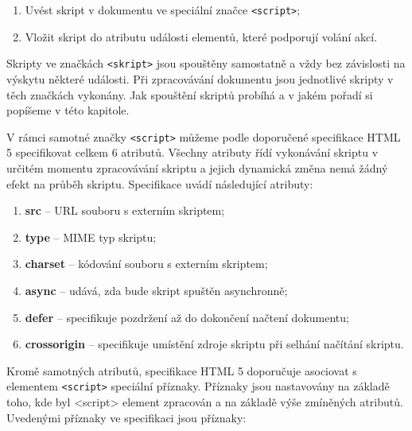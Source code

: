 \begin{enumerate}
  \item Uvést skript v dokumentu ve speciální značce \texttt{<script>};
  \item Vložit skript do atributu události elementů, které podporují volání akcí. 
\end{enumerate}

Skripty ve značkách \texttt{<skript>} jsou spouštěny samostatně a vždy bez závislosti na výskytu některé události. Při zpracovávání dokumentu jsou jednotlivé skripty v těch značkách vykonány. Jak spouštění skriptů probíhá a v jakém pořadí si popíšeme v této kapitole.

V rámci samotné značky \texttt{<script>} můžeme podle doporučené specifikace HTML 5 specifikovat celkem 6 atributů. Všechny atributy řídí vykonávání skriptu v určitém momentu zpracovávání skriptu a jejich dynamická změna nemá žádný efekt na průběh skriptu. Specifikace uvádí následující atributy:

\begin{enumerate}
  \item \textbf{src} -- URL souboru s externím skriptem;
  \item \textbf{type} -- MIME typ skriptu;
  \item \textbf{charset} -- kódování souboru s externím skriptem;
  \item \textbf{async} -- udává, zda bude skript spuštěn asynchronně;
  \item \textbf{defer} -- specifikuje pozdržení až do dokončení načtení dokumentu;
  \item \textbf{crossorigin} -- specifikuje umístění zdroje skriptu při selhání načítání skriptu. 
\end{enumerate}

Kromě samotných atributů, specifikace HTML 5 doporučuje asociovat s elementem \texttt{<script>} speciální příznaky. Příznaky jsou nastavovány na základě toho, kde byl <script> element zpracován a na základě výše zmíněných atributů. Uvedenými příznaky ve specifikaci jsou příznaky:

